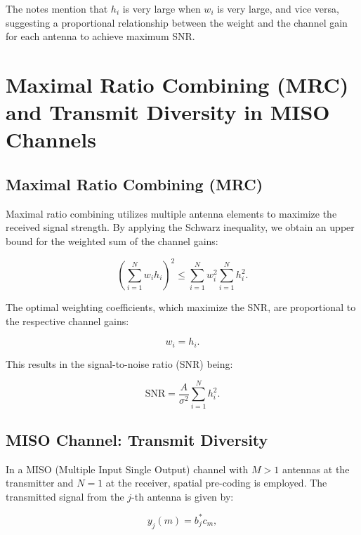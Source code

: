 The notes mention that \( h_i \) is very large when \( w_i \) is very large, and vice versa, suggesting a proportional relationship between the weight and the channel gain for each antenna to achieve maximum SNR.




\section*{Maximal Ratio Combining (MRC) and Transmit Diversity in MISO Channels}

\subsection*{Maximal Ratio Combining (MRC)}
Maximal ratio combining utilizes multiple antenna elements to maximize the received signal strength. By applying the Schwarz inequality, we obtain an upper bound for the weighted sum of the channel gains:

\begin{equation}
\left( \sum_{i=1}^{N} w_i h_i \right)^2 \leq \sum_{i=1}^{N} w_i^2 \sum_{i=1}^{N} h_i^2.
\end{equation}

The optimal weighting coefficients, which maximize the SNR, are proportional to the respective channel gains:

\begin{equation}
w_i = h_i.
\end{equation}

This results in the signal-to-noise ratio (SNR) being:

\begin{equation}
\text{SNR} = \frac{A}{\sigma^2} \sum_{i=1}^{N} h_i^2.
\end{equation}

\subsection*{MISO Channel: Transmit Diversity}
In a MISO (Multiple Input Single Output) channel with \( M > 1 \) antennas at the transmitter and \( N = 1 \) at the receiver, spatial pre-coding is employed. The transmitted signal from the \( j \)-th antenna is given by:

\begin{equation}
y_j(m) = b_j^* c_m,
\end{equation}

